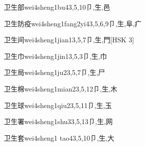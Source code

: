 \begin{EntryWithPhonetic}{卫生部}{wei4sheng1bu4}{3,5,10}{⼙,⽣,⾢}
\end{EntryWithPhonetic}

\begin{EntryWithPhonetic}{卫生防疫}{wei4sheng1fang2yi4}{3,5,6,9}{⼙,⽣,⾩,⽧}
\end{EntryWithPhonetic}

\begin{EntryWithPhonetic}{卫生间}{wei4sheng1jian1}{3,5,7}{⼙,⽣,⾨}[HSK 3]
\end{EntryWithPhonetic}

\begin{EntryWithPhonetic}{卫生巾}{wei4sheng1jin1}{3,5,3}{⼙,⽣,⼱}
\end{EntryWithPhonetic}

\begin{EntryWithPhonetic}{卫生局}{wei4sheng1ju2}{3,5,7}{⼙,⽣,⼫}
\end{EntryWithPhonetic}

\begin{EntryWithPhonetic}{卫生棉}{wei4sheng1mian2}{3,5,12}{⼙,⽣,⽊}
\end{EntryWithPhonetic}

\begin{EntryWithPhonetic}{卫生球}{wei4sheng1qiu2}{3,5,11}{⼙,⽣,⽟}
\end{EntryWithPhonetic}

\begin{EntryWithPhonetic}{卫生署}{wei4sheng1shu3}{3,5,13}{⼙,⽣,⽹}
\end{EntryWithPhonetic}

\begin{EntryWithPhonetic}{卫生套}{wei4sheng1 tao4}{3,5,10}{⼙,⽣,⼤}
\end{EntryWithPhonetic}

